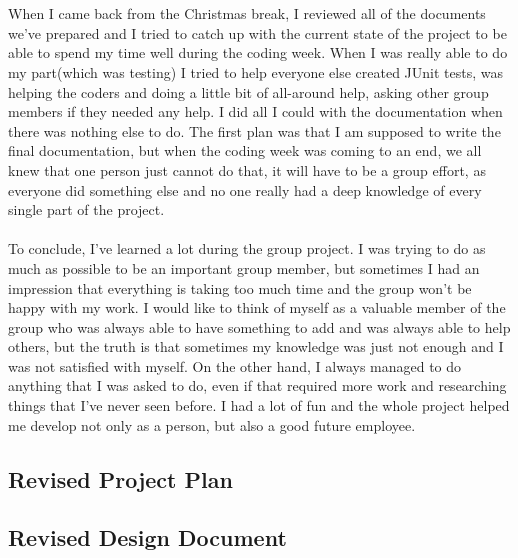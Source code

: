 \documentclass[12pt]{article}
\begin{document}
~\\\\
When I came back from the Christmas break, I reviewed all of the documents we've prepared and I tried to catch up with the current state of the project to be able to spend my time well during the coding week. When I was really able to do my part(which was testing) I tried to help everyone else created JUnit tests, was helping the coders and doing a little bit of all-around help, asking other group members if they needed any help. I did all I could with the documentation when there was nothing else to do. The first plan was that I am supposed to write the final documentation, but when the coding week was coming to an end, we all knew that one person just cannot do that, it will have to be a group effort, as everyone did something else and no one really had a deep knowledge of every single part of the project.
~\\\\
To conclude, I've learned a lot during the group project. I was trying to do as much as possible to be an important group member, but sometimes I had an impression that everything is taking too much time and the group won't be happy with my work. I would like to think of myself as a valuable member of the group who was always able to have something to add and was always able to help others, but the truth is that sometimes my knowledge was just not enough and I was not satisfied with myself. On the other hand, I always managed to do anything that I was asked to do, even if that required more work and researching things that I've never seen before. I had a lot of fun and the whole project helped me develop not only as a person, but also a good future employee.
\newpage

\subsection{Revised Project Plan}


\restoregeometry




\subsection{Revised Design Document}


\restoregeometry

\end{document}
